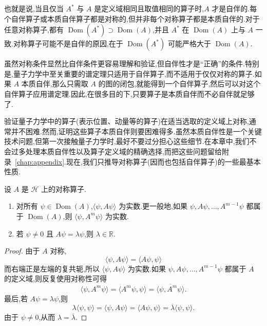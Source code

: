 也就是说,当且仅当 \(A^{*}\) 与 \(A\) 是定义域相同且取值相同的算子时,\(A\) 才是自伴的.每个自伴算子或本质自伴算子都是对称的,但并非每个对称算子都是本质自伴的.对于任意对称算子,都有 \(\operatorname{Dom}(A^{*})\supset\operatorname{Dom}(A)\),并且 \(A^{*}\) 在 \(\operatorname{Dom}(A)\) 上与 \(A\) 一致.对称算子可能不是自伴的原因,在于 \(\operatorname{Dom}(A^{*})\) 可能严格大于 \(\operatorname{Dom}(A)\).

虽然对称条件显然比自伴条件更容易理解和验证,但自伴性才是“正确”的条件.特别是,量子力学中至关重要的谱定理只适用于自伴算子,而不适用于仅仅对称的算子.如果 \(A\) 本质自伴,那么只需取 \(A\) 的图的闭包,就能得到一个自伴算子,然后可以对这个自伴算子应用谱定理.因此,在很多目的下,只要算子是本质自伴而不必自伴就足够了.

验证量子力学中的算子(表示位置、动量等的算子)在适当选取的定义域上对称,通常并不困难.然而,证明这些算子本质自伴则要困难得多.虽然本质自伴性是一个关键技术问题,但第一次接触量子力学时,最好不要过分担心这些细节.在本章中,我们不会过多处理本质自伴性以及算子定义域的精确选择,而把这些问题留给附录~\ref{chap:appendix}.现在,我们只推导对称算子(因而也包括自伴算子)的一些最基本性质.

\begin{proposition}[对称算子的基本性质]\label{prop:symmetric-properties}
设 \(A\) 是 \(\mathcal{H}\) 上的对称算子.
\begin{enumerate}
\item 对所有 \(\psi\in\operatorname{Dom}(A)\),\(\langle\psi,A\psi\rangle\) 为实数.更一般地,如果 \(\psi,A\psi,\ldots,A^{m-1}\psi\) 都属于 \(\operatorname{Dom}(A)\),则 \(\langle\psi,A^{m}\psi\rangle\) 为实数.
\item 若 \(\psi\ne0\) 且 \(A\psi=\lambda\psi\),则 \(\lambda\in\mathbb{R}\).
\end{enumerate}
\end{proposition}

\begin{proof}
由于 \(A\) 对称,
\[
\langle\psi,A\psi\rangle=\langle A\psi,\psi\rangle
\]
而右端正是左端的复共轭,所以 \(\langle\psi,A\psi\rangle\) 为实数.如果 \(\psi,A\psi,\ldots,A^{m-1}\psi\) 都属于 \(A\) 的定义域,则反复使用对称性可得
\[
\langle\psi,A^{m}\psi\rangle=\langle A^{m}\psi,\psi\rangle
=\overline{\langle\psi,A^{m}\psi\rangle}.
\]
最后,若 \(A\psi=\lambda\psi\),则
\[
\lambda\langle\psi,\psi\rangle
=\langle\psi,A\psi\rangle
=\langle A\psi,\psi\rangle
=\overline{\lambda}\langle\psi,\psi\rangle.
\]
由于 \(\psi\ne0\),从而 \(\lambda=\overline{\lambda}\).
\end{proof}

